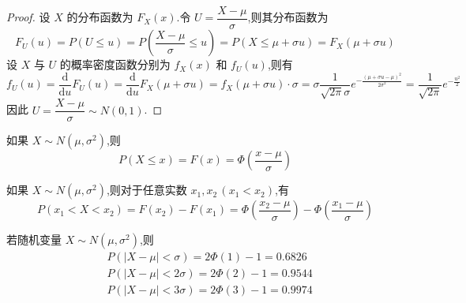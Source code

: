 \begin{proof}
    设 $X$ 的分布函数为 $F_X(x)$.令 $U = \dfrac{X - \mu}{\sigma}$,则其分布函数为
    $$
    F_U(u) = P(U \leqslant u) = P(\dfrac{X - \mu}{\sigma} \leqslant u) = P(X \leqslant \mu + \sigma u) = F_X(\mu + \sigma u)
    $$
    设 $X$ 与 $U$ 的概率密度函数分别为 $f_X(x)$ 和 $f_U(u)$,则有
    $$
    f_U(u) = \dfrac{\text{d}}{\text{d}u} F_U(u) = \dfrac{\text{d}}{\text{d}u} F_X(\mu + \sigma u) = f_X(\mu + \sigma u) \cdot \sigma = \sigma \dfrac{1}{\sqrt{2\pi} \sigma} e^{-\frac{(\mu + \sigma u - \mu)^2}{2 \sigma^2}} = \dfrac{1}{\sqrt{2\pi}} e^{-\frac{u^2}{2}}
    $$
    因此 $U = \dfrac{X - \mu}{\sigma} \sim N(0,1)$.
\end{proof}

\begin{corollary}
    \indent 如果 $X \sim N(\mu,\sigma^2)$,则
    \begin{equation} \label{equation:standard}
        P(X \leqslant x) = F(x) = \varPhi(\dfrac{x - \mu}{\sigma})
    \end{equation}
\end{corollary}

\begin{corollary}
    \indent 如果 $X \sim N(\mu,\sigma^2)$,则对于任意实数 $x_1,x_2\,(x_1 < x_2)$,有
    \begin{equation} \label{equation:正态随机变量的标准化}
        P(x_1 < X < x_2) = F(x_2)-F(x_1) = \varPhi(\dfrac{x_2-\mu}{\sigma}) - \varPhi(\dfrac{x_1-\mu}{\sigma})
    \end{equation}
\end{corollary}

\begin{conclusion}[][$3\sigma$ 规则]
    \indent 若随机变量 $X \sim N(\mu, \sigma^2)$,则
    $$
    \begin{aligned}
        & P(|X - \mu| < \sigma) = 2\varPhi(1) - 1 = 0.6826 \\
        & P(|X - \mu| < 2\sigma) = 2\varPhi(2) - 1 = 0.9544 \\
        & P(|X - \mu| < 3\sigma) = 2\varPhi(3) - 1 = 0.9974
    \end{aligned}
    $$
\end{conclusion}

